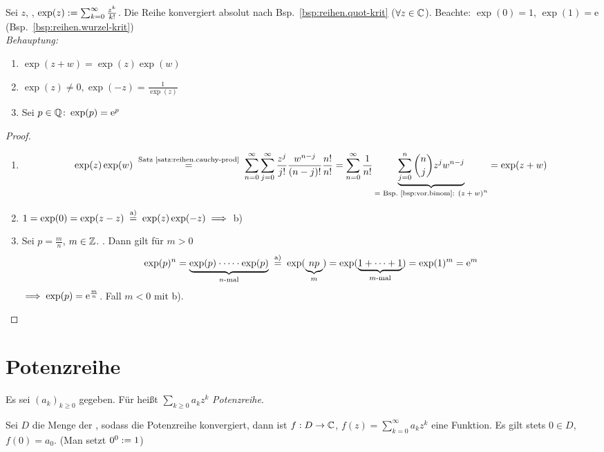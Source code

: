 \documentclass[12pt]{scrreprt}
\begin{document}
\begin{bsp}[Exponentialreihe]\label{bsp:reihen.expon-reihe}
Sei $z$, , $\exp(z) := \sum_{k=0}^\infty \frac{z^k}{k!}$.
Die Reihe konvergiert absolut nach Bsp.~\ref{bsp:reihen.quot-krit} ($\forall z\in\mathbb{C}$).
Beachte: $\exp(0) = 1$, $\exp(1) = \mathrm{e}$ (Bsp.~\ref{bsp:reihen.wurzel-krit})\\

\noindent\emph{Behauptung:}
\begin{enumerate}
\item $\exp(z+w) = \exp(z)\exp(w)$\label{bsp:reihen.expon-reihe.a}
\item $\exp(z) \neq 0, \exp(-z) = \frac{1}{\exp(z)}$\label{bsp:reihen.expon-reihe.b}
\item Sei $p\in\mathbb{Q}\colon\exp(p) = \mathrm{e}^p$\label{bsp:reihen.expon-reihe.c}
\end{enumerate}
\end{bsp}
\begin{proof}
\begin{enumerate}
\item \[\exp(z)\exp(w) \nach{=}{Satz~\ref{satz:reihen.cauchy-prod}} \sum_{n=0}^\infty\sum_{j=0}^\infty \frac{z^j}{j!} \frac{w^{n-j}}{(n-j)!} \frac{n!}{n!}
= \sum_{n=0}^\infty \frac{1}{n!} \underbrace{\sum_{j=0}^n \binom{n}{j}z^j w^{n-j}}_{\text{= Bsp.~\ref{bsp:vor.binom}: $(z+w)^n$}} 
= \exp(z+w)\]
\item $1 = \exp(0) = \exp(z-z) \nach{=}{a)} \exp(z)\exp(-z) \folgt$ b)
\item Sei $p = \frac{m}{n}$, $m\in\mathbb{Z}$. . Dann gilt für $m > 0$ 
\[\exp(p)^n = \underbrace{\exp(p)\cdot\dotsm\cdot\exp(p)}_{\text{$n$-mal}} \nach{=}{a)} \exp(\underbrace{np}_m)
= \exp(\underbrace{1+\dotsb+1}_{\text{$m$-mal}}) = \exp(1)^m =\mathrm{e}^m\]
$\implies \exp(p) = \mathrm{e}^{\frac{m}{n}}$. Fall $m < 0$ mit b).
\end{enumerate}
\end{proof}

\section{Potenzreihe}
\label{sec:reihen.potenzreihe}
\begin{dfn}\label{dfn:reihen.potenzreihe}
Es sei $(a_k)_{k\ge 0}$ gegeben. Für  heißt $\sum_{k\ge 0} a_kz^k$ \emph{Potenzreihe}.
\end{dfn}

\begin{bem*}
Sei $D$ die Menge der , sodass die Potenzreihe konvergiert, dann ist 
$f: D \rightarrow \mathbb{C}$, $f(z) = \sum_{k=0}^\infty a_kz^k$ eine Funktion. Es gilt stets
$0\in D$, $f(0)=a_0$. (Man setzt $0^0 := 1$)
\end{bem*}
\end{document}
